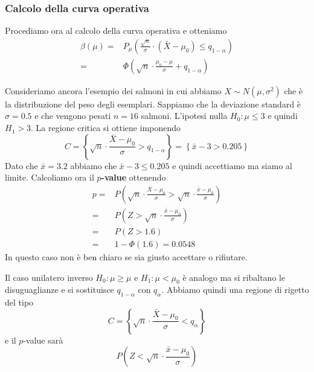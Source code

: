 \subsubsection{Calcolo della curva operativa}
Procediamo ora al calcolo della curva operativa e otteniamo
\begin{align*}
	\beta(\mu) = & P_\mu \left( \frac{\sqrt{n}}{\sigma} \cdot (\bar{X} - \mu_0) \leq
	q_{1-\alpha} \right)                                                                        \\
	=            & \Phi \left( \sqrt{n} \cdot \frac{\mu_0 - \mu}{\sigma} + q_{1-\alpha} \right)
\end{align*}

\begin{example}
	Consideriamo ancora l'esempio dei salmoni in cui abbiamo $X \sim N(\mu, \sigma^2)$ che è la
	distribuzione del peso degli esemplari. Sappiamo che la deviazione standard è $\sigma = 0.5$ e
	che vengono pesati $n = 16$ salmoni. L'ipotesi nulla $H_0 : \mu \leq 3$ e quindi $H_1 > 3$. La
	regione critica si ottiene imponendo
	\[
		C = \left\{ \sqrt{n} \cdot \frac{\bar{X} - \mu_0}{\sigma} > q_{1 - \alpha} \right\}
		= \left\{ \bar{x} - 3 > 0.205 \right\}
	\]
	Dato che $\bar{x} = 3.2$ abbiamo che $\bar{x} - 3 \leq 0.205$ e quindi accettiamo ma siamo al
	limite. Calcoliamo ora il \textbf{$p$-value} ottenendo
	\begin{align*}
		p = & P \left( \sqrt{n} \cdot \frac{\bar{X} - \mu_0}{\sigma} >
		\sqrt{n} \cdot \frac{\bar{x} - \mu_0}{\sigma} \right)                    \\
		=   & P \left( Z > \sqrt{n} \cdot \frac{\bar{x} - \mu_0}{\sigma} \right) \\
		=   & P (Z > 1.6)                                                        \\
		=   & 1 - \Phi(1.6) = 0.0548
	\end{align*}
	In questo caso non è ben chiaro se sia giusto accettare o rifiutare.
\end{example}

Il caso unilatero inverso $H_0 : \mu \geq \mu$ e $H_1 : \mu < \mu_0$ è analogo ma si ribaltano le
disuguaglianze e si sostituisce $q_{1 - \alpha}$ con $q_\alpha$. Abbiamo quindi una regione di
rigetto del tipo
\[ C = \left\{ \sqrt{n} \cdot \frac{\bar{X} - \mu_0}{\sigma} < q_\alpha \right\} \]
e il $p$-value sarà
\[ P \left( Z < \sqrt{n} \cdot \frac{\bar{x} - \mu_0}{\sigma} \right) \]